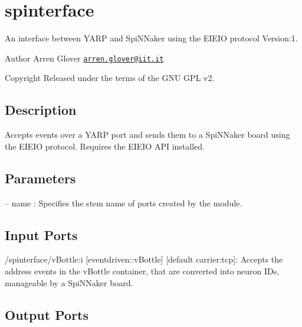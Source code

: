 \hypertarget{group__spinterface}{}\section{spinterface}
\label{group__spinterface}
An interface between Y\+A\+RP and Spi\+N\+Naker using the E\+I\+E\+IO protocol Version\+:1. \begin{DoxyAuthor}{Author}
Arren Glover \href{mailto:arren.glover@iit.it}{\tt arren.\+glover@iit.\+it} ~\newline
 
\end{DoxyAuthor}
\begin{DoxyCopyright}{Copyright}
Released under the terms of the G\+NU G\+PL v2. 
\end{DoxyCopyright}
\hypertarget{group__zynqGrabber_intro_sec}{}\subsection{Description}\label{group__zynqGrabber_intro_sec}
Accepts events over a Y\+A\+RP port and sends them to a Spi\+N\+Naker board using the E\+I\+E\+IO protocol. Requires the E\+I\+E\+IO A\+PI installed.\hypertarget{group__zynqGrabber_parameters_sec}{}\subsection{Parameters}\label{group__zynqGrabber_parameters_sec}

\begin{DoxyItemize}
\item -- name \+: Specifies the stem name of ports created by the module. 
\end{DoxyItemize}\hypertarget{group__zynqGrabber_inputports_sec}{}\subsection{Input Ports}\label{group__zynqGrabber_inputports_sec}

\begin{DoxyItemize}
\item /spinterface/v\+Bottle\+:i \mbox{[}eventdriven\+::v\+Bottle\mbox{]} \mbox{[}default carrier\+:tcp\mbox{]}\+: Accepts the address events in the v\+Bottle container, that are converted into neuron I\+Ds, manageable by a Spi\+N\+Naker board.
\end{DoxyItemize}\hypertarget{group__zynqGrabber_outputports_sec}{}\subsection{Output Ports}\label{group__zynqGrabber_outputports_sec}

